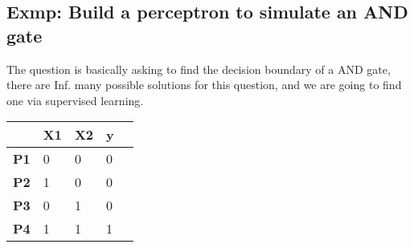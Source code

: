 \begin{center}
\end{center}
\subsection*{Exmp: Build a perceptron to simulate an AND gate}
The question is basically asking to find the decision boundary of a AND gate, there are Inf. many possible solutions for this question, and we are going to find one via supervised learning.
\begin{center}
\begin{tabular}{|l|l|l|l|l}
\hline
            & \textbf{X1} & \textbf{X2} & \textbf{y} \\ \hline
\textbf{P1} & 0           & 0           & 0          \\ \cline{1-4}
\textbf{P2} & 1           & 0           & 0          \\ \cline{1-4}
\textbf{P3} & 0           & 1           & 0          \\\cline{1-4}
\textbf{P4} & 1           & 1           & 1          \\ \hline
\end{tabular}
\end{center}


